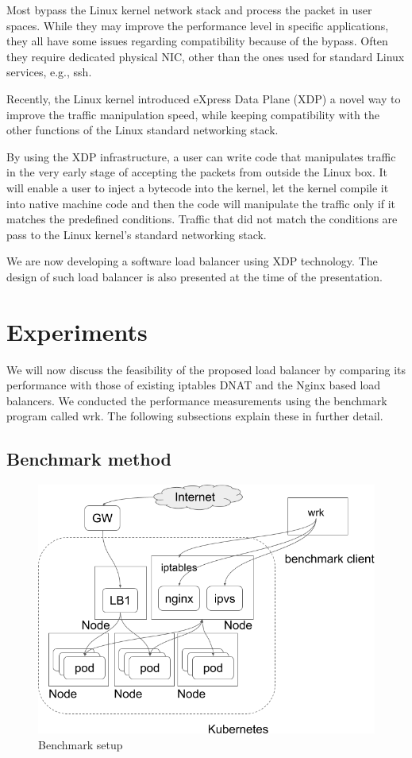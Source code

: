 Most bypass the Linux kernel network stack and process the packet in user spaces.
While they may improve the performance level in specific applications, they all have some issues regarding compatibility because of the bypass.
Often they require dedicated physical NIC, other than the ones used for standard Linux services, e.g., ssh.

Recently, the Linux kernel introduced eXpress Data Plane (XDP)\cite{bertin2017xdp} a novel way to improve the traffic manipulation speed, while keeping compatibility with the other functions of the Linux standard networking stack.

By using the XDP infrastructure, a user can write code that manipulates traffic in the very early stage of accepting the packets from outside the Linux box.
It will enable a user to inject a bytecode into the kernel, let the kernel compile it into native machine code and then the code will manipulate the traffic only if it matches the predefined conditions.
Traffic that did not match the conditions are pass to the Linux kernel's standard networking stack.

We are now developing a software load balancer using XDP technology.
The design of such load balancer is also presented at the time of the presentation.

\section{Experiments}\label{Experiments}

We will now discuss the feasibility of the proposed load balancer by comparing 
its performance with those of existing iptables DNAT and the Nginx based load balancers. 
We conducted the performance measurements using the benchmark program called wrk\cite{Glozer2016}.
The following subsections explain these in further detail. 

\subsection{Benchmark method}

\begin{figure}
\includegraphics[width=\columnwidth]{Figs/benchmark-schem}
\caption{Benchmark setup}
\label{fig:benchmark-schem}
\end{figure}


